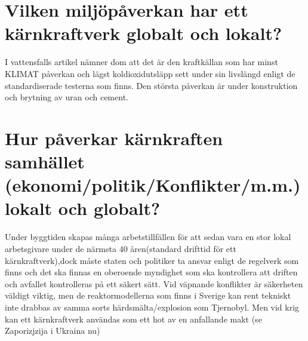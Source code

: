 \documentclass[11p]{article}
\begin{document}
    \section{Vilken miljöpåverkan har ett kärnkraftverk globalt och lokalt?}
    I vattensfalls artikel \parencite{vattenfall}nämner dom att det är den kraftkällan som har minst KLIMAT påverkan och lägst koldioxidutsläpp sett under sin livslängd enligt de standardiserade testerna som finns. Den största påverkan är under konstruktion och brytning av uran  och cement.


    \section{Hur påverkar kärnkraften samhället \\ (ekonomi/politik/Konflikter/m.m.) lokalt och globalt?}
    Under byggtiden skapas många arbetstillfällen för att sedan vara en stor lokal arbetsgivare under de närmsta 40 åren(standard drifttid för ett kärnkraftverk),dock måste staten och politiker ta ansvar enligt de regelverk som finns och det ska finnas en oberoende myndighet som ska kontrollera att driften och avfallet kontrolleras på ett säkert sätt. Vid väpnande konflikter är säkerheten väldigt viktig, men de reaktormodellerna som finns i Sverige kan rent tekniskt inte drabbas av samma sorts härdsmälta/explosion som Tjernobyl.
    Men vid krig kan ett kärnkraftverk användas som ett hot av en anfallande makt (se \parencite{Zaporizjzija}Zaporizjzija i Ukraina nu)

    \printbibliography
\end{document}
